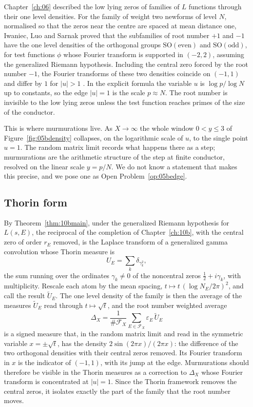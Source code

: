 Chapter~\ref{ch:06} described the low lying zeros of families of $L$ functions through their one level densities. For the family of weight two newforms of level $N$, normalised so that the zeros near the centre are spaced at mean distance one, Iwaniec, Luo and Sarnak \cite{ils2000} proved that the subfamilies of root number $+1$ and $-1$ have the one level densities of the orthogonal groups $\mathrm{SO}(\text{even})$ and $\mathrm{SO}(\text{odd})$, for test functions $\phi$ whose Fourier transform is supported in $(-2,2)$, assuming the generalized Riemann hypothesis. Including the central zero forced by the root number $-1$, the Fourier transforms of these two densities coincide on $(-1,1)$ and differ by $1$ for $|u|>1$ \cite{katzsarnak1999}. In the explicit formula the variable $u$ is $\log p/\log N$ up to constants, so the edge $|u|=1$ is the scale $p\approx N$. The root number is invisible to the low lying zeros unless the test function reaches primes of the size of the conductor.

This is where murmurations live. As $X\to\infty$ the whole window $0<y\le3$ of Figure~\ref{fig:05bdensity} collapses, on the logarithmic scale of $u$, to the single point $u=1$. The random matrix limit records what happens there as a step; murmurations are the arithmetic structure of the step at finite conductor, resolved on the linear scale $y=p/N$. We do not know a statement that makes this precise, and we pose one as Open Problem~\ref{op:05bedge}.

\subsection{Thorin form}

By Theorem~\ref{thm:10bmain}, under the generalized Riemann hypothesis for $L(s,E)$, the reciprocal of the completion of Chapter~\ref{ch:10b}, with the central zero of order $r_E$ removed, is the Laplace transform of a generalized gamma convolution whose Thorin measure is
\[
U_E=\sum_k\delta_{\gamma_k^2},
\]
the sum running over the ordinates $\gamma_k\ne0$ of the noncentral zeros $\frac12+i\gamma_k$, with multiplicity. Rescale each atom by the mean spacing, $t\mapsto t\,(\log N_E/2\pi)^2$, and call the result $\tilde U_E$. The one level density of the family is then the average of the measures $\tilde U_E$ read through $t\mapsto\sqrt t$, and the root number weighted average
\[
\Delta_X=\frac{1}{\#\mathcal{F}_X}\sum_{E\in\mathcal{F}_X}\varepsilon_E\,\tilde U_E
\]
is a signed measure that, in the random matrix limit and read in the symmetric variable $x=\pm\sqrt t$, has the density $2\sin(2\pi x)/(2\pi x)$: the difference of the two orthogonal densities with their central zeros removed. Its Fourier transform in $x$ is the indicator of $(-1,1)$, with its jump at the edge. Murmurations should therefore be visible in the Thorin measures as a correction to $\Delta_X$ whose Fourier transform is concentrated at $|u|=1$. Since the Thorin framework removes the central zeros, it isolates exactly the part of the family that the root number moves.

